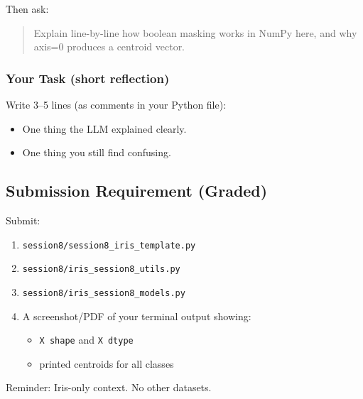 \noindent
Then ask:

\begin{quote}
    Explain line-by-line how boolean masking works in NumPy here, and why axis=0 produces a centroid vector.
\end{quote}

\subsubsection{Your Task (short reflection)}
Write 3--5 lines (as comments in your Python file):
\begin{itemize}\setlength{\itemsep}{0pt}
\item One thing the LLM explained clearly.
\item One thing you still find confusing.
\end{itemize}

\newpage
\subsection{Submission Requirement (Graded)}

\noindent
Submit:
\begin{enumerate}
    \item \texttt{session8/session8\_iris\_template.py}
    \item \texttt{session8/iris\_session8\_utils.py}
    \item \texttt{session8/iris\_session8\_models.py}
    \item A screenshot/PDF of your terminal output showing:
    \begin{itemize}\setlength{\itemsep}{0pt}
    \item \texttt{X shape} and \texttt{X dtype}
    \item printed centroids for all classes
    \end{itemize}
\end{enumerate}

\vspace{1cm}
\begin{center}
{\color{red}\Large Reminder: Iris-only context. No other datasets.}
\end{center}

